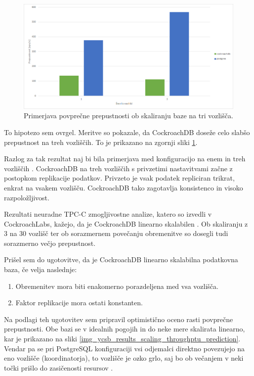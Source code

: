 \documentclass[a4paper, 12pt]{book}
\begin{document}
\begin{figure}[H]
\begin{center}
\includegraphics[width=1\textwidth]{resources/scaling-throughput-v2.png}
\end{center}
\caption{Primerjava povprečne prepustnosti ob skaliranju baze na tri vozlišča.}
\label{img_ycsb_results_scaling_throughptu_comparison}
\end{figure}

To hipotezo sem ovrgel. Meritve so pokazale, da CockroachDB doseže celo slabšo prepustnost na treh vozliščih. To je prikazano na zgornji sliki \ref{img_ycsb_results_scaling_throughptu_comparison}.

Razlog za tak rezultat naj bi bila primerjava med konfiguracijo na enem in treh vozliščih \cite{CRDB-YCSB-perf-analisis}. CockroachDB na treh vozliščih s privzetimi nastavitvami začne z postopkom replikacije podatkov. Privzeto je vsak podatek repliciran trikrat, enkrat na vsakem vozlišču. CockroachDB tako zagotavlja konsistenco in visoko razpoložljivost.

Rezultati neuradne TPC-C zmogljivostne analize, katero so izvedli v CockroachLabs, kažejo, da je CockroachDB linearno skalabilen \cite{CRDB-TPCC-perforamance-report}. Ob skaliranju z 3 na 30 vozlišč ter ob sorazmernem povečanju obremenitve so dosegli tudi sorazmerno večjo prepustnost.

Prišel sem do ugotovitve, da je CockroachDB linearno skalabilna podatkovna baza, če velja naslednje:
\begin{enumerate}
    \item Obremenitev mora biti enakomerno porazdeljena med vsa vozlišča.
    \item Faktor replikacije mora ostati konstanten.
\end{enumerate}

Na podlagi teh ugotovitev sem pripravil optimistično oceno rasti povprečne prepustnosti. Obe bazi se v idealnih pogojih in do neke mere skalirata linearno, kar je prikazano na sliki \ref{img_ycsb_results_scaling_throughptu_prediction}. Vendar pa se pri PostgreSQL konfiguraciji vsi odjemalci direktno povezujejo na eno vozlišče (koordinatorja), to vozlišče je ozko grlo, saj bo ob večanjem v neki točki prišlo do zasičenosti resursov \cite{Citus-add-coordinator}.
\end{document}
